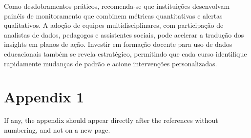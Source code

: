 \documentclass[english, spanish, brazilian]{RBIEarticle} %
\begin{document}
Como desdobramentos práticos, recomenda-se que instituições desenvolvam painéis de monitoramento que combinem métricas quantitativas e alertas qualitativos. A adoção de equipes multidisciplinares, com participação de analistas de dados, pedagogos e assistentes sociais, pode acelerar a tradução dos insights em planos de ação. Investir em formação docente para uso de dados educacionais também se revela estratégico, permitindo que cada curso identifique rapidamente mudanças de padrão e acione intervenções personalizadas.

\newpage
\printbibliography


\iffalse %
     \section*{Appendix 1}
    \label{apendice1}
    
    If any, the appendix should appear directly after the references without numbering, and not on a new page.
    
\end{document}
